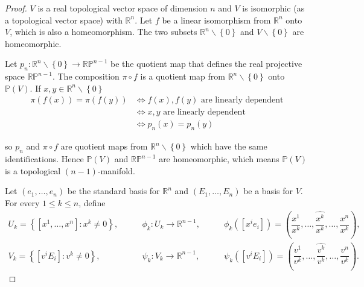 \begin{proof}
    \( V \) is a real topological vector space of dimension \( n \) and \( V \) is isomorphic (as a topological vector space) with \( \mathbb{R}^{n} \). Let \( f \) be a linear isomorphism from \( \mathbb{R}^{n} \) onto \( V \), which is also a homeomorphism. The two subsets \( \mathbb{R}^{n} \smallsetminus \left\{ 0 \right\} \) and \( V \smallsetminus \left\{ 0 \right\} \) are homeomorphic.

    Let \( p_{n}: \mathbb{R}^{n} \smallsetminus \left\{ 0 \right\} \to \mathbb{RP}^{n-1} \) be the quotient map that defines the real projective space \( \mathbb{RP}^{n-1} \). The composition \( \pi \circ f \) is a quotient map from \( \mathbb{R}^{n} \smallsetminus \left\{ 0 \right\} \) onto \( \mathbb{P}(V) \). If \( x, y \in \mathbb{R}^{n} \smallsetminus \left\{ 0 \right\} \)
    \begingroup
    \allowdisplaybreaks%
    \begin{align*}
        \pi(f(x)) = \pi(f(y)) & \iff f(x), f(y) \text{ are linearly dependent} \\
                              & \iff x, y \text{ are linearly dependent}       \\
                              & \iff p_{n}(x) = p_{n}(y)
    \end{align*}
    \endgroup

    so \( p_{n} \) and \( \pi \circ f \) are quotient maps from \( \mathbb{R}^{n} \smallsetminus \left\{ 0 \right\} \) which have the same identifications. Hence \( \mathbb{P}(V) \) and \( \mathbb{RP}^{n-1} \) are homeomorphic, which means \( \mathbb{P}(V) \) is a topological \( (n - 1) \)-manifold.

    Let \( (e_{1}, \ldots, e_{n}) \) be the standard basis for \( \mathbb{R}^{n} \) and \( (E_{1}, \ldots, E_{n}) \) be a basis for \( V \). For every \( 1 \le k \le n \), define
    \begingroup
    \allowdisplaybreaks%
    \begin{align*}
        U_{k} = \left\{ [x^{1}, \ldots, x^{n}]: x^{k} \ne 0 \right\}, & \qquad \phi_{k}: U_{k} \to \mathbb{R}^{n-1}, & \qquad \phi_{k}([x^{i}e_{i}]) = \left( \dfrac{x^{1}}{x^{k}}, \ldots, \widehat{\dfrac{x^{k}}{x^{k}}}, \ldots, \dfrac{x^{n}}{x^{k}} \right),  \\
        V_{k} = \left\{ [v^{i} E_{i}]: v^{k} \ne 0 \right\},          & \qquad \psi_{k}: V_{k} \to \mathbb{R}^{n-1}, & \qquad \psi_{k}([v^{i} E_{i}]) = \left( \dfrac{v^{1}}{v^{k}}, \ldots, \widehat{\dfrac{v^{k}}{v^{k}}}, \ldots, \dfrac{v^{n}}{v^{k}} \right).
    \end{align*}
    \endgroup


\end{proof}
